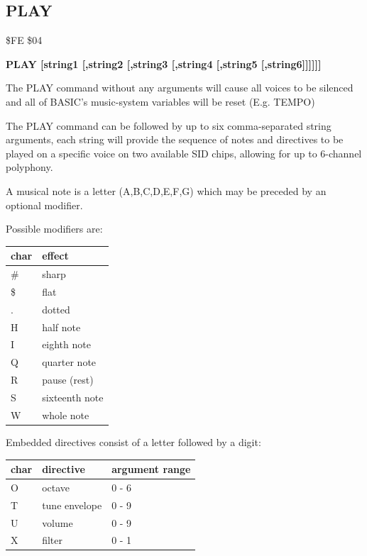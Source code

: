\subsection{PLAY}
\begin{description}[leftmargin=2cm,style=nextline]
\item [Token:] \$FE \$04
\item [Format:] {\bf PLAY [string1 [,string2 [,string3 [,string4 [,string5 [,string6]]]]]]}
\item [Usage:] The PLAY command without any arguments will cause all voices to be silenced
               and all of BASIC's music-system variables will be reset (E.g. TEMPO)

               The PLAY command can be followed by up to six comma-separated string arguments,
               each string will provide the sequence of notes and directives to be played on
               a specific voice on two available SID chips, allowing for up to 6-channel polyphony.

               A musical note is a letter (A,B,C,D,E,F,G)
               which may be preceded by an optional modifier.

               Possible modifiers are:

{\setlength{\tabcolsep}{1mm}
\ttfamily
\begin{tabular}{*{1}{|R{9mm}}|l|}
\hline
 char  & effect \\
\hline
 \# & sharp \\
 \$ & flat \\
  . & dotted \\
  H & half note \\
  I & eighth note \\
  Q & quarter note \\
  R & pause (rest) \\
  S & sixteenth note \\
  W & whole note \\
\hline
\end{tabular}
}

Embedded directives consist of a letter followed by a digit:

{\setlength{\tabcolsep}{1mm}
\ttfamily
\begin{tabular}{*{1}{|R{9mm}}|l|l|}
\hline
 char  & directive & argument range \\
\hline
  O & octave        & 0 - 6 \\
  T & tune envelope & 0 - 9 \\
  U & volume        & 0 - 9 \\
  X & filter        & 0 - 1 \\
\hline
\end{tabular}
}


\end{description}
